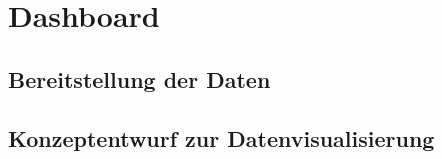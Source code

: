 \section{Dashboard}\label{sec:Datenvisualisierung}
\subsection{Bereitstellung der Daten}
\subsection{Konzeptentwurf zur Datenvisualisierung}